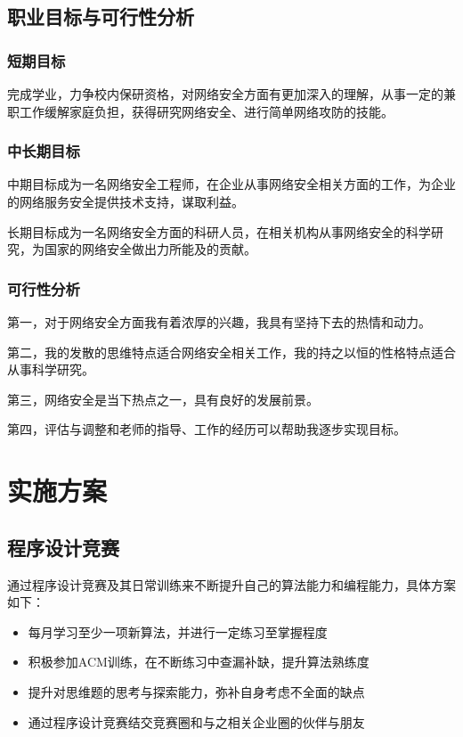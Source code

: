 \documentclass{article}
\begin{document}
\subsection{职业目标与可行性分析}

\subsubsection{短期目标}

完成学业，力争校内保研资格，对网络安全方面有更加深入的理解，从事一定的兼职工作缓解家庭负担，获得研究网络安全、进行简单网络攻防的技能。

\subsubsection{中长期目标}

中期目标成为一名网络安全工程师，在企业从事网络安全相关方面的工作，为企业的网络服务安全提供技术支持，谋取利益。

长期目标成为一名网络安全方面的科研人员，在相关机构从事网络安全的科学研究，为国家的网络安全做出力所能及的贡献。

\subsubsection{可行性分析}

第一，对于网络安全方面我有着浓厚的兴趣，我具有坚持下去的热情和动力。

第二，我的发散的思维特点适合网络安全相关工作，我的持之以恒的性格特点适合从事科学研究。

第三，网络安全是当下热点之一，具有良好的发展前景。

第四，评估与调整和老师的指导、工作的经历可以帮助我逐步实现目标。

\section{实施方案}

\subsection{程序设计竞赛}

通过程序设计竞赛及其日常训练来不断提升自己的算法能力和编程能力，具体方案如下：

\begin{itemize}
    \item 每月学习至少一项新算法，并进行一定练习至掌握程度
    \item 积极参加ACM训练，在不断练习中查漏补缺，提升算法熟练度
    \item 提升对思维题的思考与探索能力，弥补自身考虑不全面的缺点
    \item 通过程序设计竞赛结交竞赛圈和与之相关企业圈的伙伴与朋友
\end{itemize}
\end{document}
